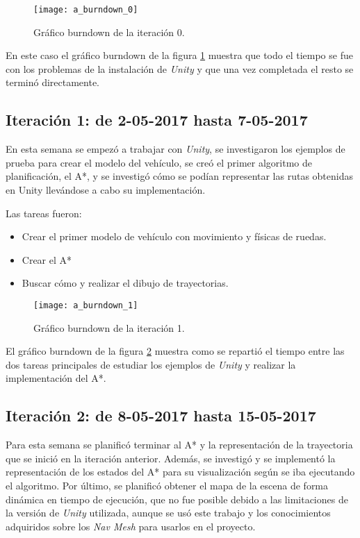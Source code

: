 \begin{figure}[htpb]
    \centering
    \texttt{[image: a\_burndown\_0]}
    \caption[Gráfico burndown de la iteración 0]{Gráfico burndown de la iteración 0.}
    \label{fig:burndown0}
\end{figure}

En este caso el gráfico burndown de la figura \ref{fig:burndown0} muestra que todo el tiempo se fue con los problemas de la instalación de \textit{Unity} y que una vez completada el resto se terminó directamente.

\newpage
\subsection{Iteración 1: de 2-05-2017 hasta 7-05-2017}
En esta semana se empezó a trabajar con \textit{Unity}, se investigaron los ejemplos de prueba para crear el modelo del vehículo, se creó el primer algoritmo de planificación, el A*, y se investigó cómo se podían representar las rutas obtenidas en Unity llevándose a cabo su implementación.

Las tareas fueron:
\begin{itemize}
\item Crear el primer modelo de vehículo con movimiento y físicas de ruedas.
\item Crear el A*
\item Buscar cómo y realizar el dibujo de trayectorias.
\end{itemize}

\begin{figure}[htpb]
    \centering
    \texttt{[image: a\_burndown\_1]}
    \caption[Gráfico burndown de la iteración 1]{Gráfico burndown de la iteración 1.}
    \label{fig:burndown1}
\end{figure}

El gráfico burndown de la figura \ref{fig:burndown1} muestra como se repartió el tiempo entre las dos tareas principales de estudiar los ejemplos de \textit{Unity} y realizar la implementación del A*.

\newpage
\subsection{Iteración 2: de 8-05-2017 hasta 15-05-2017}
Para esta semana se planificó terminar al A* y la representación de la trayectoria que se inició en la iteración anterior. Además, se investigó y se implementó la representación de los estados del A* para su visualización según se iba ejecutando el algoritmo. Por último, se planificó obtener el mapa de la escena de forma dinámica en tiempo de ejecución, que no fue posible debido a las limitaciones de la versión de \textit{Unity} utilizada, aunque se usó este trabajo y los conocimientos adquiridos sobre los \textit{Nav Mesh} para usarlos en el proyecto.

